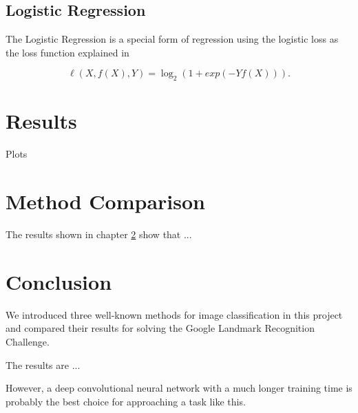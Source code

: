 \section{Logistic Regression}

The Logistic Regression is a special form of regression using the logistic loss as the loss function explained in \cite{logistic-loss}

\[\ell(X, f(X), Y) = \log_2(1 + exp(-Y f(X))).\]

\chapter{Results}\label{results}

Plots

\chapter{Method Comparison}

The results shown in chapter \ref{results} show that ...

\chapter{Conclusion}

We introduced three well-known methods for image classification in this project and compared their results for solving the Google Landmark Recognition Challenge.

The results are ...

However, a deep convolutional neural network with a much longer training time is probably the best choice for approaching a task like this.